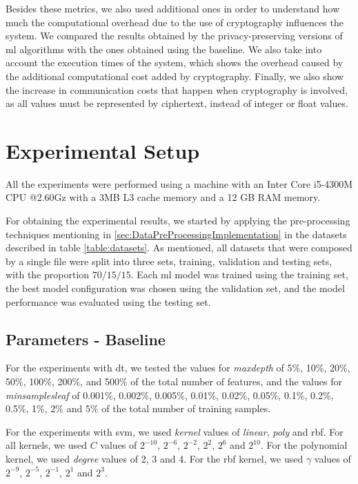 Besides these metrics, we also used additional ones in order to understand how much the computational overhead due to the use of cryptography influences the system.
We compared the results obtained by the privacy-preserving versions of \ac{ml} algorithms with the ones obtained using the baseline. We also take into account the execution times of the system, which shows the overhead caused by the additional computational cost added by cryptography.
Finally, we also show the increase in communication costs that happen when cryptography is involved, as all values must be represented by ciphertext, instead of integer or float values.


\section{Experimental Setup}
\label{sec:ExperimentalSetup}

All the experiments were performed using a machine with an Inter Core i5-4300M CPU @2.60Gz with a 3MB L3 cache memory and a 12 GB RAM memory.

For obtaining the experimental results, we started by applying the pre-processing techniques mentioning in \ref{sec:DataPreProcessingImplementation} in the datasets described in table \ref{table:datasets}. As mentioned, all datasets that were composed by a single file were split into three sets, training, validation and testing sets, with the proportion $70/15/15$. Each \ac{ml} model was trained using the training set, the best model configuration was chosen using the validation set, and the model performance was evaluated using the testing set.

\subsection{Parameters - Baseline}

For the experiments with \ac{dt}, we tested the values for \textit{max\textunderscore depth} of 5\%, 10\%, 20\%, 50\%, 100\%, 200\%, and 500\% of the total number of features, and the values for \textit{min\textunderscore samples\textunderscore leaf} of 0.001\%, 0.002\%, 0.005\%, 0.01\%, 0.02\%, 0.05\%, 0.1\%, 0.2\%, 0.5\%, 1\%, 2\% and 5\% of the total number of training samples.

For the experiments with \ac{svm}, we used \textit{kernel} values of \textit{linear}, \textit{poly} and \ac{rbf}. For all kernels, we used $C$ values of $2^{-10}$, $2^{-6}$, $2^{-2}$, $2^{2}$, $2^{6}$ and $2^{10}$. For the polynomial kernel, we used \textit{degree} values of 2, 3 and 4. For the \ac{rbf} kernel, we used $\gamma$ values of $2^{-9}$, $2^{-5}$, $2^{-1}$, $2^{1}$ and $2^{3}$.

